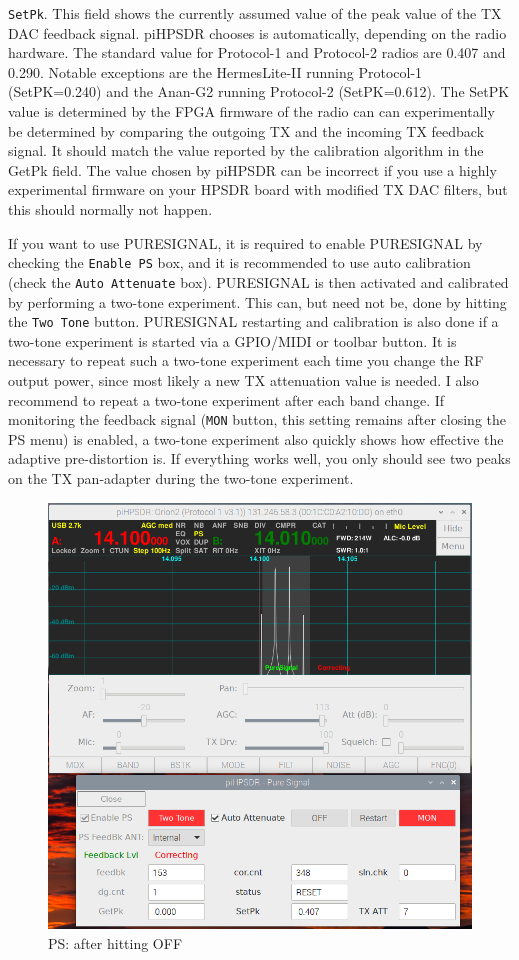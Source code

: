 \documentclass[12pt]{book}
\def\rett#1{\texttt{\color{red}#1}}
\def\pH{pi\-HPSDR\xspace}
\begin{document}
\rett{SetPk}. This field shows the currently assumed value of the peak value of the TX DAC
feedback signal. \pH chooses is automatically, depending on the radio hardware.
The standard value for Protocol-1 and Protocol-2 radios are 0.407 and 0.290. Notable exceptions are
the HermesLite-II running Protocol-1 (SetPK=0.240) and the Anan-G2 running Protocol-2 (SetPK=0.612).
The SetPK value is determined by the FPGA firmware of the radio can can experimentally
be determined by comparing the outgoing TX and the incoming TX feedback signal.
 It should match the value reported
by the calibration algorithm in the GetPk field. The  value
chosen by \pH can be incorrect if you use a highly experimental firmware on your
HPSDR board with modified TX DAC filters, but this should normally not happen.

If you want to use PURESIGNAL, it is required to enable PURESIGNAL by checking the
\rett{Enable PS} box, and it is recommended to use auto calibration (check the
\rett{Auto Attenuate} box). PURESIGNAL is then activated and calibrated by
performing a two-tone experiment. This can, but need not be, done by hitting
the \rett{Two Tone} button. PURESIGNAL restarting and calibration is also done
if a two-tone experiment is started via a GPIO/MIDI or toolbar button.
It is necessary to repeat such a two-tone experiment each time you change the
RF output power, since most likely a new TX attenuation value is needed. I also
recommend to repeat a two-tone experiment after each band change. If monitoring
the feedback signal (\rett{MON} button, this setting remains after closing the
PS menu) is enabled, a two-tone experiment also quickly shows how effective
the adaptive pre-distortion is. If everything works well, you only should see
two peaks on the TX pan-adapter during the two-tone experiment.

\begin{figure}[t!]
\center
\includegraphics[width=12cm]{PSoff.png}
\caption{PS: after hitting OFF}
\label{fig:PSoff}
\end{figure}
\end{document}
